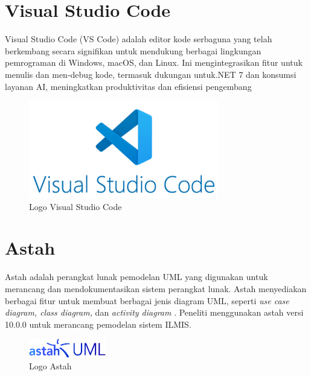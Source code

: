 \section{Visual Studio Code}
Visual Studio Code (VS Code) adalah editor kode serbaguna yang telah berkembang secara signifikan untuk mendukung berbagai lingkungan pemrograman di Windows, macOS, dan Linux. Ini mengintegrasikan fitur untuk menulis dan men-debug kode, termasuk dukungan untuk.NET 7 dan konsumsi layanan AI, meningkatkan produktivitas dan efisiensi pengembang \cite{bree2016using}

\begin{figure}
	\centering
	\includegraphics[width=0.30\linewidth]{konten//gambar/logo-vs-code.png}
	\caption{Logo Visual Studio Code}
	\label{fig:enter-label}
\end{figure}

\section{Astah}
Astah adalah perangkat lunak pemodelan UML yang digunakan untuk merancang dan mendokumentasikan sistem perangkat lunak. Astah menyediakan berbagai fitur untuk membuat berbagai jenis diagram UML, seperti \textit{use case diagram, class diagram,} dan \textit{activity diagram} \cite{hayati2021sistem}. Peneliti menggunakan astah versi 10.0.0 untuk merancang pemodelan sistem ILMIS.
\begin{figure}
	\centering
	\includegraphics[width=0.3\textwidth]{konten/gambar/astah.png}
	\caption{Logo Astah}
	\label{LogoAstah}
\end{figure}

